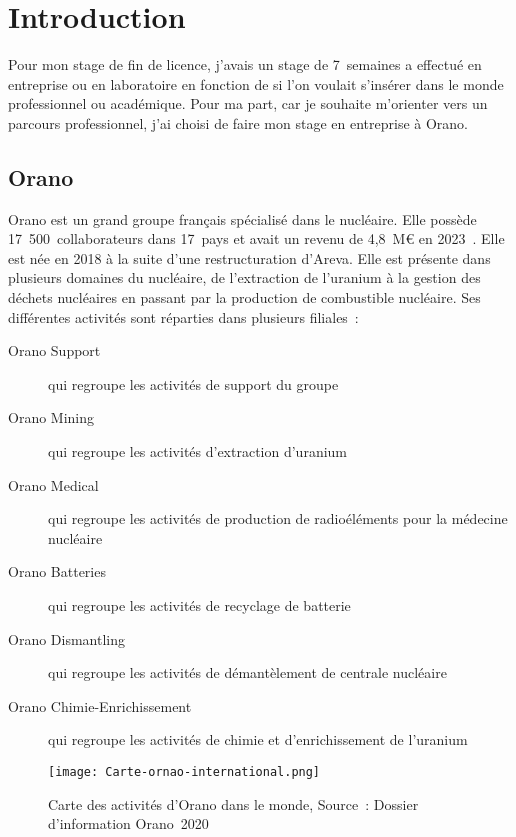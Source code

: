 \section{Introduction}

Pour mon stage de fin de licence, j'avais un stage de 7~semaines a effectué en entreprise ou en laboratoire en fonction de si l'on voulait s'insérer dans le monde professionnel ou académique. Pour ma part, car je souhaite  m'orienter vers un parcours professionnel, j'ai choisi de faire mon stage en entreprise à Orano.
\subsection{Orano}
Orano est un grand groupe français spécialisé dans le nucléaire. Elle possède 17~500~collaborateurs dans 17~pays et avait un revenu de 4,8~M€ en 2023~\cite{report:rapport_activiter}. Elle est née en 2018 à la suite d'une restructuration d'Areva. Elle est présente dans plusieurs domaines du nucléaire, de l'extraction de l'uranium à la gestion des déchets nucléaires en passant par la production de combustible nucléaire. Ses différentes activités sont réparties dans plusieurs filiales~:
\begin{description}
    \item [Orano Support] qui regroupe les activités de support du groupe
    \item [Orano Mining]qui regroupe les activités d'extraction d'uranium
    \item [Orano Medical]qui regroupe les activités de production de radioéléments pour la médecine nucléaire
    \item [Orano Batteries]qui regroupe les activités de recyclage de batterie
    \item [Orano Dismantling]qui regroupe les activités de démantèlement de centrale nucléaire
    \item [Orano Chimie-Enrichissement]qui regroupe les activités de chimie et d'enrichissement de l'uranium
\end{description}
\begin{figure}
    \centering
    \texttt{[image: Carte-ornao-international.png]}
    \caption[Carte des activités d’Orano dans le monde]{Carte des activités d’Orano dans le monde, Source~: Dossier d’information Orano~2020}
    \label{fig_carte_orano}
\end{figure}









